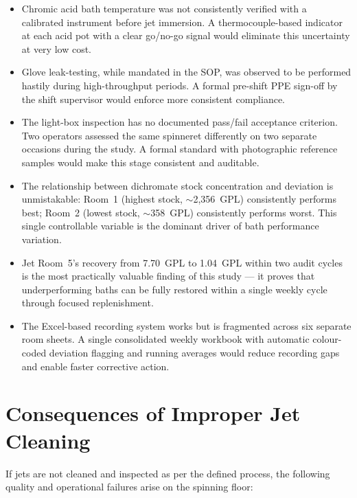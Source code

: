 \documentclass{book}
\begin{document}
\begin{itemize}[leftmargin=1.5em]
  \item Chromic acid bath temperature was not consistently verified with a calibrated instrument before jet immersion. A thermocouple-based indicator at each acid pot with a clear go/no-go signal would eliminate this uncertainty at very low cost.

  \item Glove leak-testing, while mandated in the SOP, was observed to be performed hastily during high-throughput periods. A formal pre-shift PPE sign-off by the shift supervisor would enforce more consistent compliance.

  \item The light-box inspection has no documented pass/fail acceptance criterion. Two operators assessed the same spinneret differently on two separate occasions during the study. A formal standard with photographic reference samples would make this stage consistent and auditable.

  \item The relationship between dichromate stock concentration and deviation is unmistakable: Room~1 (highest stock, $\sim$2{,}356~GPL) consistently performs best; Room~2 (lowest stock, $\sim$358~GPL) consistently performs worst. This single controllable variable is the dominant driver of bath performance variation.

  \item Jet Room~5's recovery from 7.70~GPL to 1.04~GPL within two audit cycles is the most practically valuable finding of this study --- it proves that underperforming baths can be fully restored within a single weekly cycle through focused replenishment.

  \item The Excel-based recording system works but is fragmented across six separate room sheets. A single consolidated weekly workbook with automatic colour-coded deviation flagging and running averages would reduce recording gaps and enable faster corrective action.
\end{itemize}

\section{Consequences of Improper Jet Cleaning}

If jets are not cleaned and inspected as per the defined process, the following quality and operational failures arise on the spinning floor:
\end{document}
